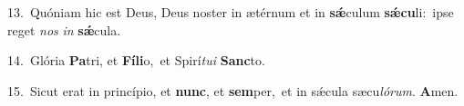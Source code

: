 {\numbfont\textcolor{\numbcolor}{13.}}~Quóniam hic est Deus, Deus noster in ætérnum et in \textbf{sǽ}\-culum \textbf{sǽ}\-\textbf{cu}li:~\star ipse reget \textit{nos} \textit{in} \textbf{sǽ}\-cula.\par
{\numbfont\textcolor{\numbcolor}{14.}}~Glória \textbf{Pa}\-tri, et \textbf{Fí}\-\textbf{li}o,~\star et Spirí\-\textit{tu}\-\textit{i} \textbf{Sanc}\-to.\par
{\numbfont\textcolor{\numbcolor}{15.}}~Sicut erat in princípio, et \textbf{nunc}\-, et \textbf{sem}\-per,~\star et in sǽcula sæcu\-\textit{ló}\-\textit{rum}. \textbf{A}\-men.\par
